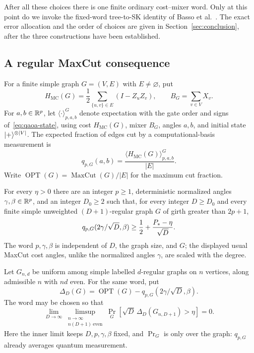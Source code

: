 After all these choices there is one finite ordinary cost--mixer
word. Only at this point do we invoke the fixed-word tree-to-SK
identity of Basso et al.~\cite{BFMVZ2022}. The exact error allocation
and the order of choices are given in Section~\ref{sec:conclusion},
after the three constructions have been established.

\subsection{A regular MaxCut consequence}\label{sec:regular-maxcut}

For a finite simple graph $G=(V,E)$ with $E\ne\varnothing$, put
\[
 H_{\mathrm{MC}}(G)=\frac12\sum_{\{u,v\}\in E}(I-Z_uZ_v),
 \qquad B_G=\sum_{v\in V}X_v.
\]
For $a,b\in\mathbb R^p$, let $\langle\cdot\rangle^G_{p,a,b}$ denote expectation
with the gate order and signs of~\eqref{eq:qaoa-state}, using cost
$H_{\mathrm{MC}}(G)$, mixer $B_G$, angles $a,b$, and initial state
$\lvert +\rangle^{\otimes |V|}$.  The expected fraction of edges cut by a
computational-basis measurement is
\[
 q_{p,G}(a,b)=\frac{\langle H_{\mathrm{MC}}(G)\rangle^G_{p,a,b}}{|E|}.
\]
Write $\operatorname{OPT}(G)=\operatorname{MaxCut}(G)/|E|$ for the maximum
cut fraction.

\begin{corollary}
\label{cor:regular-maxcut}
For every $\eta>0$ there are an integer $p\ge1$, deterministic normalized
angles $\gamma,\beta\in\mathbb R^p$, and an integer $D_0\ge2$ such that, for every
integer $D\ge D_0$ and every finite simple unweighted $(D+1)$-regular graph
$G$ of girth greater than $2p+1$,
\begin{equation}\label{eq:high-girth-maxcut}
 q_{p,G}(2\gamma/\sqrt D,\beta)
 \ge \frac12+\frac{P_*-\eta}{\sqrt D}.
\end{equation}
The word $p,\gamma,\beta$ is independent of $D$, the graph size, and $G$;
the displayed usual MaxCut cost angles, unlike the normalized angles
$\gamma$, are scaled with the degree.

Let $G_{n,d}$ be uniform among simple labelled $d$-regular graphs on $n$
vertices, along admissible $n$ with $nd$ even.  For the same word, put
\[
 \Delta_D(G)=\operatorname{OPT}(G)
             -q_{p,G}(2\gamma/\sqrt D,\beta).
\]
The word may be chosen so that
\begin{equation}\label{eq:random-regular-maxcut}
 \lim_{D\to\infty}
 \limsup_{\substack{n\to\infty\\ n(D+1)\ \mathrm{even}}}
 \Pr_G\!\left[\sqrt D\,\Delta_D(G_{n,D+1})>\eta\right]=0.
\end{equation}
Here the inner limit keeps $D,p,\gamma,\beta$ fixed, and $\Pr_G$ is only
over the graph: $q_{p,G}$ already averages quantum measurement.
\end{corollary}

